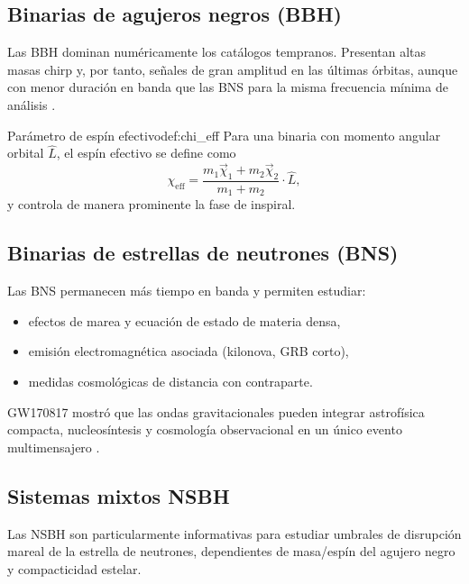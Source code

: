 \subsection{Binarias de agujeros negros (BBH)}

Las BBH dominan numéricamente los catálogos tempranos. Presentan altas masas chirp y, por tanto, señales de gran amplitud en las últimas órbitas, aunque con menor duración en banda que las BNS para la misma frecuencia mínima de análisis \cite{GWTC1, GWTC3}.

\begin{definicion}{Parámetro de espín efectivo}{def:chi_eff}
Para una binaria con momento angular orbital $\hat{L}$, el espín efectivo se define como
\begin{equation}
\chi_{\mathrm{eff}}=
\frac{m_1\vec\chi_1+m_2\vec\chi_2}{m_1+m_2}\cdot\hat{L},
\end{equation}
y controla de manera prominente la fase de inspiral.
\end{definicion}

\subsection{Binarias de estrellas de neutrones (BNS)}

Las BNS permanecen más tiempo en banda y permiten estudiar:
\begin{itemize}[leftmargin=2em]
  \item efectos de marea y ecuación de estado de materia densa,
  \item emisión electromagnética asociada (kilonova, GRB corto),
  \item medidas cosmológicas de distancia con contraparte.
\end{itemize}

\begin{importante}
GW170817 mostró que las ondas gravitacionales pueden integrar astrofísica compacta, nucleosíntesis y cosmología observacional en un único evento multimensajero \cite{Abbott2017BNS, Abbott2017multimessenger, Abbott2017H0}.
\end{importante}

\subsection{Sistemas mixtos NSBH}

Las NSBH son particularmente informativas para estudiar umbrales de disrupción mareal de la estrella de neutrones, dependientes de masa/espín del agujero negro y compacticidad estelar.

